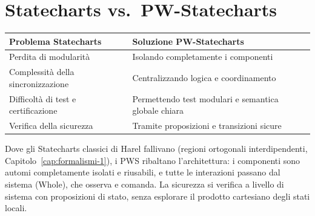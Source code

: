 \section{Statecharts vs.\ PW-Statecharts}
\begin{note}[Confronto]
\begin{tabular}{p{}p{}}
\textbf{Problema Statecharts} & \textbf{Soluzione PW-Statecharts}\\
\hline
Perdita di modularità & Isolando completamente i componenti\\
Complessità della sincronizzazione & Centralizzando logica e coordinamento\\
Difficoltà di test e certificazione & Permettendo test modulari e semantica globale chiara\\
Verifica della sicurezza & Tramite proposizioni e transizioni sicure\\
\end{tabular}
\end{note}

\begin{intuition}[In sintesi]
Dove gli Statecharts classici di Harel fallivano (regioni ortogonali interdipendenti, Capitolo~\ref{cap:formalismi-1}), i PWS ribaltano l'architettura: i componenti sono automi completamente isolati e riusabili, e tutte le interazioni passano dal sistema (Whole), che osserva e comanda. La sicurezza si verifica a livello di sistema con proposizioni di stato, senza esplorare il prodotto cartesiano degli stati locali.
\end{intuition}
